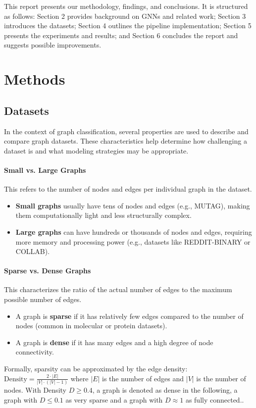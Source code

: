 \documentclass[11pt,a4paper]{article}
\begin{document}
	This report presents our methodology, findings, and conclusions. It is structured as follows: Section 2 provides background on GNNs and related work; Section 3 introduces the datasets; Section 4 outlines the pipeline implementation; Section 5 presents the experiments and results; and Section 6 concludes the report and suggests possible improvements.
	
	\section{Methods}
	
	\subsection{Datasets}
	In the context of graph classification, several properties are used to describe and compare graph datasets. These characteristics help determine how challenging a dataset is and what modeling strategies may be appropriate.
	
	\paragraph{Small vs. Large Graphs} 
	This refers to the number of nodes and edges per individual graph in the dataset. 
	\begin{itemize}
		\item \textbf{Small graphs} usually have tens of nodes and edges (e.g., MUTAG), making them computationally light and less structurally complex.
		\item \textbf{Large graphs} can have hundreds or thousands of nodes and edges, requiring more memory and processing power (e.g., datasets like REDDIT-BINARY or COLLAB).
	\end{itemize}
	
	\paragraph{Sparse vs. Dense Graphs} 
	This characterizes the ratio of the actual number of edges to the maximum possible number of edges.
	\begin{itemize}
		\item A graph is \textbf{sparse} if it has relatively few edges compared to the number of nodes (common in molecular or protein datasets).
		\item A graph is \textbf{dense} if it has many edges and a high degree of node connectivity.
	\end{itemize}
	Formally, sparsity can be approximated by the edge density:
	$\text{Density} = \frac{2 \cdot |E|}{|V| \cdot (|V| - 1)}$
	where $|E|$ is the number of edges and $|V|$ is the number of nodes. With Density $D \geq 0.4$, a graph is denoted as dense in the following, a graph with $D \leq 0.1$ as very sparse and a graph with $D \approx 1$ as fully connected..
	
\end{document}
